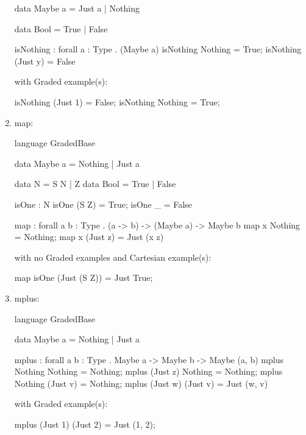 \begin{enumerate}
\begin{granule}
data Maybe a = Just a | Nothing 
    
data Bool = True | False 
    
isNothing : forall { a : Type } . (Maybe a) %
isNothing Nothing = True;
isNothing (Just y) = False
\end{granule}
with Graded example(s):
\begin{granule}
isNothing (Just 1) = False;
isNothing Nothing = True;
\end{granule}
\item map: 
\begin{granule}
language GradedBase

data Maybe a = Nothing | Just a

data N = S N | Z
data Bool = True | False

isOne : N %
isOne (S Z) = True;
isOne _ = False

map : forall { a b : Type }
    . (a -> b) %
    -> (Maybe a) %
    -> Maybe b
map x Nothing = Nothing;
map x (Just z) = Just (x z)
\end{granule}
with no Graded examples and Cartesian example(s):
\begin{granule}
map isOne (Just (S Z)) = Just True;
\end{granule}
\item mplus: 
\begin{granule}
language GradedBase

data Maybe a = Nothing | Just a

mplus : forall { a b : Type }
      . Maybe a %
      -> Maybe b %
      -> Maybe (a, b)
mplus Nothing Nothing = Nothing;
mplus (Just z) Nothing = Nothing;
mplus Nothing (Just v) = Nothing;
mplus (Just w) (Just v) = Just (w, v)
\end{granule}
with Graded example(s):
\begin{granule}
mplus (Just 1) (Just 2) = Just (1, 2);
\end{granule}
\end{enumerate}
